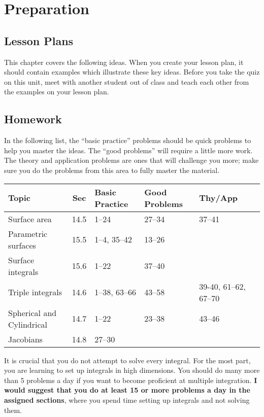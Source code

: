 \section{Preparation}

\subsection{Lesson Plans}

This chapter covers the following ideas. When you create your lesson plan, it should contain examples which illustrate these key ideas. Before you take the quiz on this unit, meet with another student out of class and teach each other from the examples on your lesson plan. 





\subsection{Homework}

In the following list, the ``basic practice'' problems should be quick
problems to help you master the ideas.  The ``good problems'' will
require a little more work.  The theory and application problems are
ones that will challenge you more; make sure you do the problems from
this area to fully master the material.  

{\centering
\begin{tabular}{lcllll}\toprule
Topic &Sec &Basic Practice &Good Problems &Thy/App \\\midrule

Surface area & 14.5 & 1--24 & 27--34 & 37--41\\\hline
Parametric surfaces & 15.5 & 1--4, 35--42 & 13--26\\\hline
Surface integrals & 15.6 & 1--22 & 37--40\\\bottomrule
Triple integrals & 14.6 & 1--38, 63--66 & 43--58 & 39-40, 61--62, 67--70\\\hline
Spherical and Cylindrical & 14.7 & 1--22 & 23--38 & 43--46\\\hline
Jacobians & 14.8 & 27--30&&\\\hline
\end{tabular}

} 
\bigskip
It is crucial that you do not attempt to solve every integral.  For
the most part, you are learning to set up integrals in high
dimensions. You should do many more than 5 problems a day if you want
to become proficient at multiple integration.  \textbf{I would suggest
  that you do at least 15 or more problems a day in the assigned
  sections}, where you spend time setting up integrals and not solving
them.


